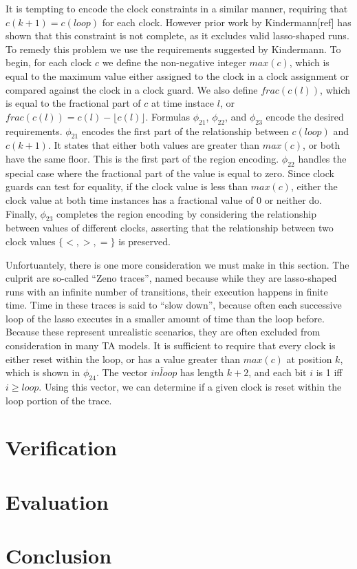 \documentclass[a4paper,12pt]{article}
\begin{document}
It is tempting to encode the clock constraints in a similar manner, requiring
that \(c(k+1) = c(loop)\) for each clock. However prior work by Kindermann[ref]
has shown that this constraint is not complete, as it excludes valid
lasso-shaped runs. To remedy this problem we use the requirements suggested by
Kindermann. To begin, for each clock \(c\) we define the non-negative integer
\(max(c)\), which is equal to the maximum value either assigned to the clock in
a clock assignment or compared against the clock in a clock guard. We also
define \(frac(c(l))\), which is equal to the fractional part of \(c\) at time
instace \(l\), or \(frac(c(l)) = c(l) - \lfloor c(l) \rfloor\). Formulas
\(\phi_{21}\), \(\phi_{22}\), and \(\phi_{23}\) encode the desired requirements.
\(\phi_{21}\) encodes the first part of the relationship between \(c(loop)\) and
\(c(k+1)\). It states that either both values are greater than \(max(c)\), or
both have the same floor. This is the first part of the region encoding.
\(\phi_{22}\) handles the special case where the fractional part of the value is
equal to zero. Since clock guards can test for equality, if the clock value is
less than \(max(c)\), either the clock value at both time instances has a
fractional value of 0 or neither do. Finally, \(\phi_{23}\) completes the region
encoding by considering the relationship between values of different clocks,
asserting that the relationship between two clock values \(\{<,>,=\}\) is
preserved.

Unfortuantely, there is one more consideration we must make in this section. The
culprit are so-called ``Zeno traces'', named because while they are lasso-shaped
runs with an infinite number of transitions, their execution happens in finite
time. Time in these traces is said to ``slow down'', because often each successive
loop of the lasso executes in a smaller amount of time than the loop before.
Because these represent unrealistic scenarios, they are often excluded from
consideration in many TA models. It is sufficient to require that every clock is
either reset within the loop, or has a value greater than \(max(c)\) at position
\(k\), which is shown in \(\phi_{24}\). The vector \(\overleftarrow{inloop}\)
has length \(k+2\), and each bit \(i\) is 1 iff \(i \geq loop\). Using this
vector, we can determine if a given clock is reset within the loop portion of
the trace.


\section{Verification}
\label{sec:orgda2630c}
\section{Evaluation}
\label{sec:org4dabf4a}
\section{Conclusion}
\label{sec:org83e7004}
\end{document}
